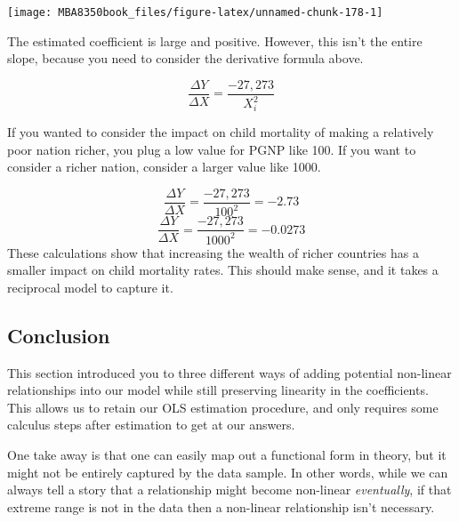 \documentclass[
]{book}
\newenvironment{Shaded}{\begin{snugshade}}{\end{snugshade}}
\newcommand{\AttributeTok}[1]{\textcolor[rgb]{0.77,0.63,0.00}{#1}}
\newcommand{\FunctionTok}[1]{\textcolor[rgb]{0.00,0.00,0.00}{#1}}
\newcommand{\NormalTok}[1]{#1}
\newcommand{\SpecialCharTok}[1]{\textcolor[rgb]{0.00,0.00,0.00}{#1}}
\newcommand{\StringTok}[1]{\textcolor[rgb]{0.31,0.60,0.02}{#1}}
\begin{document}
\begin{Shaded}
\end{Shaded}

\begin{center}\texttt{[image: MBA8350book\_files/figure-latex/unnamed-chunk-178-1]} \end{center}

The estimated coefficient is large and positive. However, this isn't the entire slope, because you need to consider the derivative formula above.

\[\frac{\Delta Y}{\Delta X} = \frac{-27,273} {X_i^{2}}\]

If you wanted to consider the impact on child mortality of making a relatively poor nation richer, you plug a low value for PGNP like 100. If you want to consider a richer nation, consider a larger value like 1000.

\[\frac{\Delta Y}{\Delta X} = \frac{-27,273} {100^{2}} = -2.73\]
\[\frac{\Delta Y}{\Delta X} = \frac{-27,273} {1000^{2}} = -0.0273\]
These calculations show that increasing the wealth of richer countries has a smaller impact on child mortality rates. This should make sense, and it takes a reciprocal model to capture it.

\hypertarget{conclusion}{%
\subsection{Conclusion}\label{conclusion}}

This section introduced you to three different ways of adding potential non-linear relationships into our model while still preserving linearity in the coefficients. This allows us to retain our OLS estimation procedure, and only requires some calculus steps after estimation to get at our answers.

One take away is that one can easily map out a functional form in theory, but it might not be entirely captured by the data sample. In other words, while we can always tell a story that a relationship might become non-linear \emph{eventually}, if that extreme range is not in the data then a non-linear relationship isn't necessary.
\end{document}
